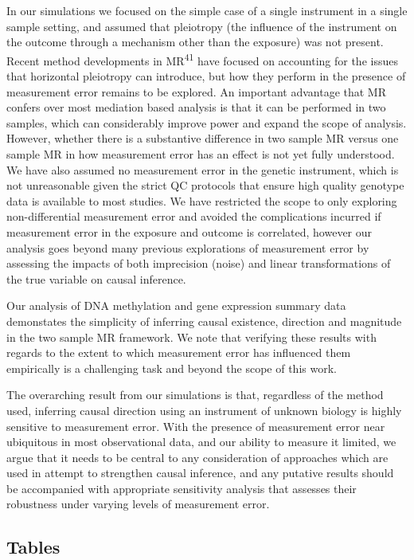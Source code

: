 \documentclass[]{article}
\begin{document}
In our simulations we focused on the simple case of a single instrument
in a single sample setting, and assumed that pleiotropy (the influence
of the instrument on the outcome through a mechanism other than the
exposure) was not present. Recent method developments in
MR\textsuperscript{41} have focused on accounting for the issues that
horizontal pleiotropy can introduce, but how they perform in the
presence of measurement error remains to be explored. An important
advantage that MR confers over most mediation based analysis is that it
can be performed in two samples, which can considerably improve power
and expand the scope of analysis. However, whether there is a
substantive difference in two sample MR versus one sample MR in how
measurement error has an effect is not yet fully understood. We have
also assumed no measurement error in the genetic instrument, which is
not unreasonable given the strict QC protocols that ensure high quality
genotype data is available to most studies. We have restricted the scope
to only exploring non-differential measurement error and avoided the
complications incurred if measurement error in the exposure and outcome
is correlated, however our analysis goes beyond many previous
explorations of measurement error by assessing the impacts of both
imprecision (noise) and linear transformations of the true variable on
causal inference.

Our analysis of DNA methylation and gene expression summary data
demonstates the simplicity of inferring causal existence, direction and
magnitude in the two sample MR framework. We note that verifying these
results with regards to the extent to which measurement error has
influenced them empirically is a challenging task and beyond the scope
of this work.

The overarching result from our simulations is that, regardless of the
method used, inferring causal direction using an instrument of unknown
biology is highly sensitive to measurement error. With the presence of
measurement error near ubiquitous in most observational data, and our
ability to measure it limited, we argue that it needs to be central to
any consideration of approaches which are used in attempt to strengthen
causal inference, and any putative results should be accompanied with
appropriate sensitivity analysis that assesses their robustness under
varying levels of measurement error.

\newpage

\subsection{Tables}\label{tables}
\end{document}
